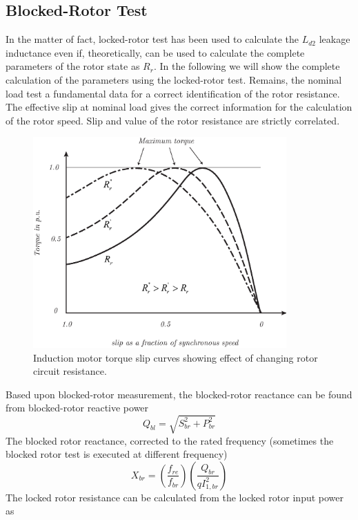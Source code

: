 \documentclass[11pt,a4paper,oneside]{book}
\numberwithin{equation}{section}
\theoremstyle{it}
\theoremstyle{definition}
\begin{document}
\subsection{Blocked-Rotor Test}
In the matter of fact, locked-rotor test has been used to calculate the $L_{d2}$ leakage inductance even if, theoretically, can be used to calculate the complete parameters of the rotor state as $R_r$. 
In the following we will show the complete calculation of the parameters using the locked-rotor test. Remains, the nominal load test a fundamental data for a correct identification of the rotor resistance. The effective slip at nominal load gives the correct information for the calculation of the rotor speed. Slip and value of the rotor resistance are strictly correlated.
\begin{figure}[htbp]
	\centering
	\includegraphics[width = 275pt, keepaspectratio]{figures/rotor_res_effects.eps}
	\captionsetup{width=0.5\textwidth}		
	\caption{Induction motor torque slip curves showing effect of changing rotor circuit resistance.}
	\label{figure:rotor_res_effects} 
\end{figure}
Based upon blocked-rotor measurement, the blocked-rotor reactance can be found from blocked-rotor reactive power
\begin{equation} \label{eq19}
	Q_{bl} = \sqrt{S_{br}^2+P_{br}^2}
\end{equation} 
The blocked rotor reactance, corrected to the rated frequency (sometimes the blocked rotor test is executed at different frequency)
\begin{equation} \label{eq20}
	X_{br} = \left( \frac{f_{re}}{f_{br}}\right) \left(\frac{Q_{br}}{qI_{1,br}^2}\right)
\end{equation} 
The locked rotor resistance can be calculated from the locked rotor input power as 
\end{document}
